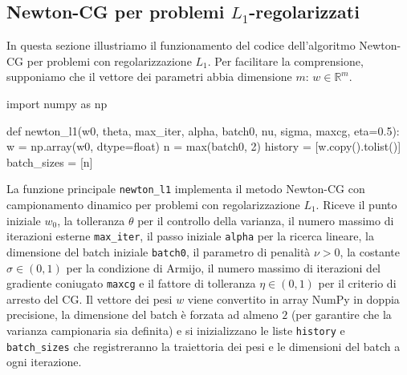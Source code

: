 \documentclass[a4paper,12pt]{article}
\numberwithin{equation}{section}
\numberwithin{figure}{section}
\numberwithin{table}{section}
\begin{document}
\subsection{Newton-CG per problemi $L_1$-regolarizzati}

In questa sezione illustriamo il funzionamento del codice dell'algoritmo Newton-CG
per problemi con regolarizzazione $L_1$. Per facilitare la comprensione, supponiamo
che il vettore dei parametri abbia dimensione $m$: $w \in \mathbb{R}^m$.

\begin{pythoncode}[title= Newton-L1]

import numpy as np

def newton_l1(w0, theta, max_iter, alpha, batch0, nu, sigma, maxcg, eta=0.5):
    w = np.array(w0, dtype=float)
    n = max(batch0, 2)
    history     = [w.copy().tolist()]
    batch_sizes = [n]
\end{pythoncode}
La funzione principale \texttt{newton\_l1} implementa il metodo Newton-CG con campionamento dinamico per problemi con regolarizzazione $L_1$. Riceve il punto iniziale $w_0$, la tolleranza $\theta$ per il controllo della varianza, il numero massimo di iterazioni esterne \texttt{max\_iter}, il passo iniziale \texttt{alpha} per la ricerca lineare, la dimensione del batch iniziale \texttt{batch0}, il parametro di penalità $\nu > 0$, la costante $\sigma \in (0,1)$ per la condizione di Armijo, il numero massimo di iterazioni del gradiente coniugato \texttt{maxcg} e il fattore di tolleranza $\eta \in (0,1)$ per il criterio di arresto del CG. Il vettore dei pesi $w$ viene convertito in array NumPy in doppia precisione, la dimensione del batch è forzata ad almeno $2$ (per garantire che la varianza campionaria sia definita) e si inizializzano le liste \texttt{history} e \texttt{batch\_sizes} che registreranno la traiettoria dei pesi e le dimensioni del batch a ogni iterazione.
\end{document}
